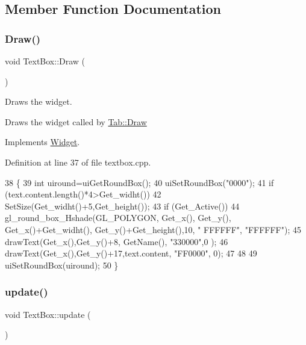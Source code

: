 \subsection{Member Function Documentation}
\mbox{\label{class_text_box_ad0d6ca66198e14fec70ff2f891034f0c}} 
\subsubsection{\texorpdfstring{Draw()}{Draw()}}
{\footnotesize\ttfamily void Text\+Box\+::\+Draw (\begin{DoxyParamCaption}{ }\end{DoxyParamCaption})\hspace{0.3cm}{\ttfamily [virtual]}}



Draws the widget. 

Draws the widget called by \hyperlink{class_tab_ae9db0c3ae8b0b75f7c5b3493b0267482}{Tab\+::\+Draw} 

Implements \hyperlink{class_widget_ac4c2063cd671468ad05d84cfe963c032}{Widget}.



Definition at line 37 of file textbox.\+cpp.


\begin{DoxyCode}
38 \{
39     \textcolor{keywordtype}{int} uiround=uiGetRoundBox();
40     uiSetRoundBox(\textcolor{stringliteral}{"0000"});
41     \textcolor{keywordflow}{if} (text.content.length()*4>Get\_widht())
42         SetSize(Get\_widht()+5,Get\_height());
43     \textcolor{keywordflow}{if} (Get\_Active())
44         gl\_round\_box\_Hshade(GL\_POLYGON, Get\_x(), Get\_y(), Get\_x()+Get\_widht(), Get\_y()+Get\_height(),10, \textcolor{stringliteral}{"
      FFFFFF"},  \textcolor{stringliteral}{"FFFFFF"});
45     drawText(Get\_x(),Get\_y()+8, GetName(), \textcolor{stringliteral}{"330000"},0 );
46     drawText(Get\_x(),Get\_y()+17,text.content, \textcolor{stringliteral}{"FF0000"}, 0);
47         
48 
49     uiSetRoundBox(uiround);
50 \}
\end{DoxyCode}
\mbox{\label{class_text_box_afa0bba711f542abe6c4d304fe2773cd9}} 
\subsubsection{\texorpdfstring{update()}{update()}}
{\footnotesize\ttfamily void Text\+Box\+::update (\begin{DoxyParamCaption}{ }\end{DoxyParamCaption})\hspace{0.3cm}{\ttfamily [virtual]}}



